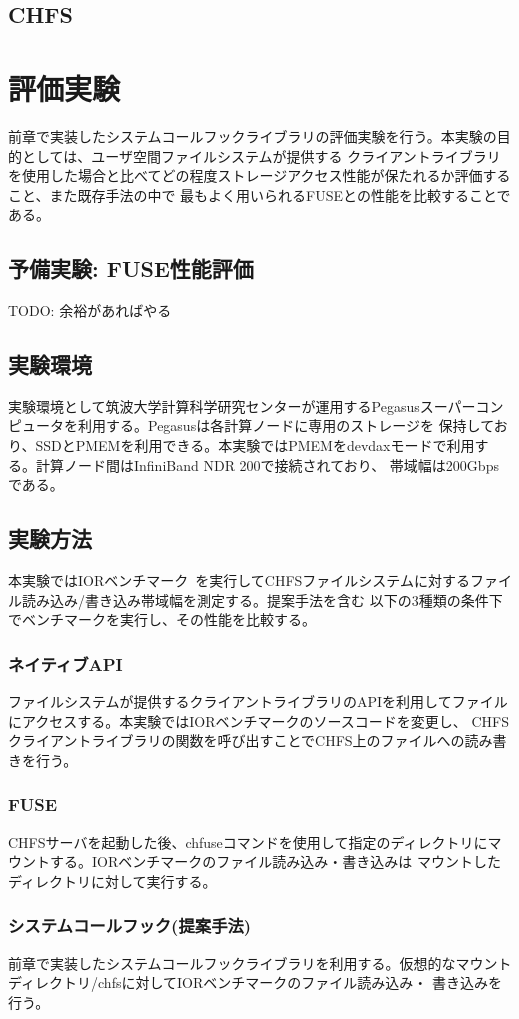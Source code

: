 \documentclass[a4paper,11pt]{jreport}
\begin{document}
\section{CHFS}

\chapter{評価実験}
前章で実装したシステムコールフックライブラリの評価実験を行う。本実験の目的としては、ユーザ空間ファイルシステムが提供する
クライアントライブラリを使用した場合と比べてどの程度ストレージアクセス性能が保たれるか評価すること、また既存手法の中で
最もよく用いられるFUSEとの性能を比較することである。

\section{予備実験: FUSE性能評価}
TODO: 余裕があればやる
\section{実験環境}
実験環境として筑波大学計算科学研究センターが運用するPegasusスーパーコンピュータを利用する。Pegasusは各計算ノードに専用のストレージを
保持しており、SSDとPMEMを利用できる。本実験ではPMEMをdevdaxモードで利用する。計算ノード間はInfiniBand NDR 200で接続されており、
帯域幅は200Gbpsである。
\section{実験方法}
本実験ではIORベンチマーク~\cite{ior}を実行してCHFSファイルシステムに対するファイル読み込み/書き込み帯域幅を測定する。提案手法を含む
以下の3種類の条件下でベンチマークを実行し、その性能を比較する。

\subsection{ネイティブAPI}
ファイルシステムが提供するクライアントライブラリのAPIを利用してファイルにアクセスする。本実験ではIORベンチマークのソースコードを変更し、
CHFSクライアントライブラリの関数を呼び出すことでCHFS上のファイルへの読み書きを行う。
\subsection{FUSE}
CHFSサーバを起動した後、chfuseコマンドを使用して指定のディレクトリにマウントする。IORベンチマークのファイル読み込み・書き込みは
マウントしたディレクトリに対して実行する。
\subsection{システムコールフック(提案手法)}
前章で実装したシステムコールフックライブラリを利用する。仮想的なマウントディレクトリ/chfsに対してIORベンチマークのファイル読み込み・
書き込みを行う。
\end{document}
